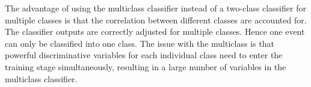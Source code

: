 The advantage of using the multiclass classifier instead of a two-class classifier for multiple classes is that the correlation between different classes are accounted for. The classifier outputs are correctly adjusted for multiple classes. Hence one event can only be classified into one class. The issue with the multiclass is that powerful discriminative variables for each individual class need to enter the training stage simultaneously, resulting in a large number of variables in the  multiclass classifier.


